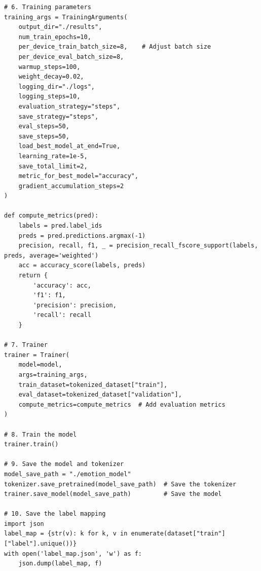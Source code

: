 \documentclass[journal]{IEEEtran}
\begin{document}
\begin{verbatim}
# 6. Training parameters
training_args = TrainingArguments(
    output_dir="./results",
    num_train_epochs=10,
    per_device_train_batch_size=8,    # Adjust batch size
    per_device_eval_batch_size=8,
    warmup_steps=100,
    weight_decay=0.02,
    logging_dir="./logs",
    logging_steps=10,
    evaluation_strategy="steps",
    save_strategy="steps",
    eval_steps=50,
    save_steps=50,
    load_best_model_at_end=True,
    learning_rate=1e-5,
    save_total_limit=2,
    metric_for_best_model="accuracy",
    gradient_accumulation_steps=2
)

def compute_metrics(pred):
    labels = pred.label_ids
    preds = pred.predictions.argmax(-1)
    precision, recall, f1, _ = precision_recall_fscore_support(labels, preds, average='weighted')
    acc = accuracy_score(labels, preds)
    return {
        'accuracy': acc,
        'f1': f1,
        'precision': precision,
        'recall': recall
    }

# 7. Trainer
trainer = Trainer(
    model=model,
    args=training_args,
    train_dataset=tokenized_dataset["train"],
    eval_dataset=tokenized_dataset["validation"],
    compute_metrics=compute_metrics  # Add evaluation metrics
)

# 8. Train the model
trainer.train()

# 9. Save the model and tokenizer
model_save_path = "./emotion_model"
tokenizer.save_pretrained(model_save_path)  # Save the tokenizer
trainer.save_model(model_save_path)         # Save the model

# 10. Save the label mapping
import json
label_map = {str(v): k for k, v in enumerate(dataset["train"]["label"].unique())}
with open('label_map.json', 'w') as f:
    json.dump(label_map, f)
\end{verbatim}
\end{document}
